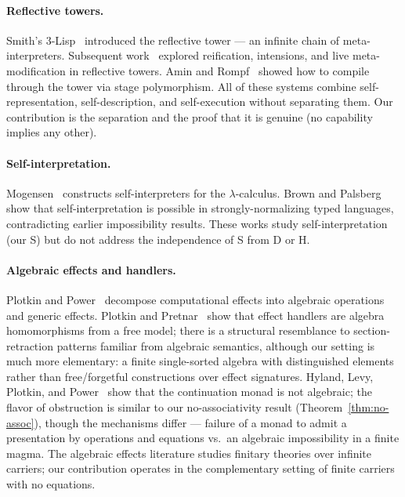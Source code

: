 \documentclass[sigconf,screen,review,anonymous]{acmart}
\begin{document}
\paragraph{Reflective towers.}
Smith's 3-Lisp~\cite{smith84} introduced the reflective tower — an infinite chain of meta-interpreters. Subsequent work~\cite{friedman84,danvy88} explored reification, intensions, and live meta-modification in reflective towers. Amin and Rompf~\cite{amin18} showed how to compile through the tower via stage polymorphism. All of these systems combine self-representation, self-description, and self-execution without separating them. Our contribution is the separation and the proof that it is genuine (no capability implies any other).

\paragraph{Self-interpretation.}
Mogensen~\cite{mogensen92} constructs self-interpreters for the $\lambda$-calculus. Brown and Palsberg~\cite{brown16} show that self-interpretation is possible in strongly-normalizing typed languages, contradicting earlier impossibility results. These works study self-interpretation (our S) but do not address the independence of S from D or H.

\paragraph{Algebraic effects and handlers.}
Plotkin and Power~\cite{plotkin03} decompose computational effects into algebraic operations and generic effects. Plotkin and Pretnar~\cite{plotkin09} show that effect handlers are algebra homomorphisms from a free model; there is a structural resemblance to section-retraction patterns familiar from algebraic semantics, although our setting is much more elementary: a finite single-sorted algebra with distinguished elements rather than free/forgetful constructions over effect signatures. Hyland, Levy, Plotkin, and Power~\cite{hyland06} show that the continuation monad is not algebraic; the flavor of obstruction is similar to our no-associativity result (Theorem~\ref{thm:no-assoc}), though the mechanisms differ — failure of a monad to admit a presentation by operations and equations vs.\ an algebraic impossibility in a finite magma. The algebraic effects literature studies finitary theories over infinite carriers; our contribution operates in the complementary setting of finite carriers with no equations.
\end{document}
